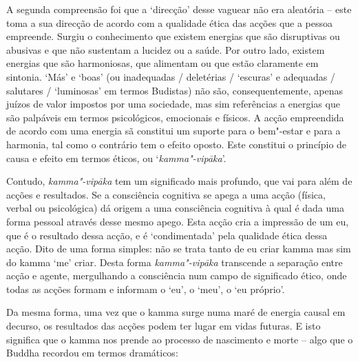 A segunda compreensão foi que a `direcção' desse vaguear não era aleatória --
este toma a sua direcção de acordo com a qualidade ética das acções que a pessoa
empreende. Surgiu o conhecimento que existem energias que são disruptivas ou
abusivas e que não sustentam a lucidez ou a saúde. Por outro lado, existem
energias que são harmoniosas, que alimentam ou que estão claramente em sintonia.
`Más' e `boas' (ou inadequadas / deletérias / `escuras' e
adequadas / salutares / `luminosas' em termos Budistas) não são, consequentemente,
apenas juízos de valor impostos por uma sociedade, mas sim referências a
energias que são palpáveis em termos psicológicos, emocionais e físicos. A acção
empreendida de acordo com uma energia sã constitui um suporte para o bem"-estar e
para a harmonia, tal como o contrário tem o efeito oposto. Este constitui o
princípio de causa e efeito em termos éticos, ou `\emph{kamma"-vipāka}'.

Contudo, \emph{kamma"-vipāka} tem um significado mais profundo, que vai para além
de acções e resultados. Se a consciência cognitiva se apega a uma acção (física,
verbal ou psicológica) dá origem a uma consciência cognitiva à qual é dada uma
forma pessoal através desse mesmo apego. Esta acção cria a impressão de um eu,
que é o resultado dessa acção, e é `condimentada' pela qualidade ética dessa
acção. Dito de uma forma simples: não se trata tanto de eu criar kamma mas sim
do kamma `me' criar. Desta forma \emph{kamma"-vipāka} transcende a separação
entre acção e agente, mergulhando a consciência num campo de significado ético,
onde todas as acções formam e informam o `eu', o `meu', o `eu próprio'.

Da mesma forma, uma vez que o kamma surge numa maré de energia causal em
decurso, os resultados das acções podem ter lugar em vidas futuras. E isto
significa que o kamma nos prende ao processo de nascimento e morte -- algo que o
Buddha recordou em termos dramáticos:

